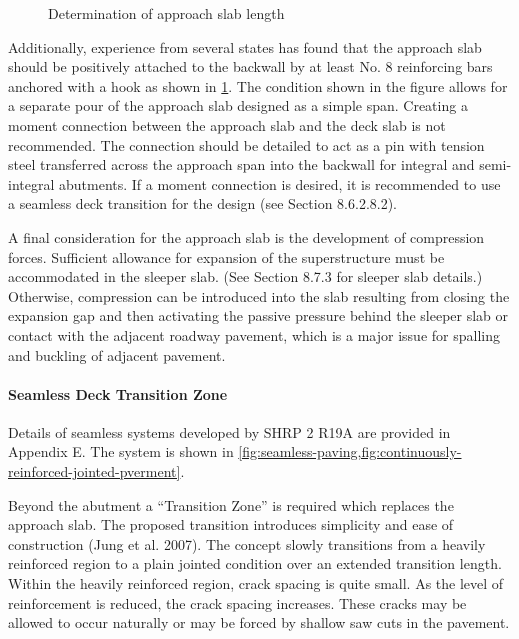 \begin{figure}
  \caption{Determination of approach slab length}
  \label{fig:determination-approach-slab-length}
\end{figure}

Additionally, experience from several states has found that the approach slab should be positively attached to the
backwall by at least No. 8 reinforcing bars anchored with a hook as shown in \cref{fig:determination-approach-slab-length}. The condition shown in the
figure allows for a separate pour of the approach slab designed as a simple span. Creating a moment connection
between the approach slab and the deck slab is not recommended. The connection should be detailed to act as a pin
with tension steel transferred across the approach span into the backwall for integral and semi-integral abutments. If a
moment connection is desired, it is recommended to use a seamless deck transition for the design (see Section
8.6.2.8.2).

A final consideration for the approach slab is the development of compression forces. Sufficient allowance for
expansion of the superstructure must be accommodated in the sleeper slab. (See Section 8.7.3 for sleeper slab details.)
Otherwise, compression can be introduced into the slab resulting from closing the expansion gap and then activating
the passive pressure behind the sleeper slab or contact with the adjacent roadway pavement, which is a major issue for
spalling and buckling of adjacent pavement.





\paragraph{Seamless Deck Transition Zone}
Details of seamless systems developed by SHRP 2 R19A are provided in Appendix E. The system is shown in \cref{fig:seamless-paving,fig:continuously-reinforced-jointed-pverment}.

Beyond the abutment a “Transition Zone” is required which replaces the approach slab. The proposed transition
introduces simplicity and ease of construction (Jung et al. 2007). The concept slowly transitions from a heavily
reinforced region to a plain jointed condition over an extended transition length. Within the heavily reinforced region,
crack spacing is quite small. As the level of reinforcement is reduced, the crack spacing increases. These cracks may
be allowed to occur naturally or may be forced by shallow saw cuts in the pavement.


